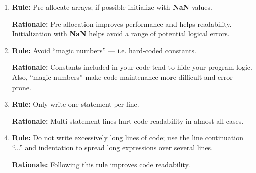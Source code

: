 \documentclass{tufte-book}
\theoremstyle{break}
\begin{document}
\begin{enumerate}
\item \textbf{Rule:} Pre-allocate arrays; if possible initialize with \textbf{NaN} values.

\textbf{Rationale:} Pre-allocation improves performance and helps readability. Initialization with \textbf{NaN} helps avoid a range of potential logical errors.

\item \textbf{Rule:} Avoid ``magic numbers'' --- i.e. hard-coded constants.

\textbf{Rationale:} Constants included in your code tend to hide your program logic. Also, ``magic numbers'' make code maintenance more difficult and error prone.

\item \textbf{Rule:} Only write one statement per line.

\textbf{Rationale:} Multi-statement-lines hurt code readability in almost all cases.

\item \textbf{Rule:} Do not write excessively long lines of code; use the line continuation ``...'' and indentation to spread long expressions over several lines.

\textbf{Rationale:} Following this rule improves code readability.
\end{enumerate}


\printindex
\end{document}
